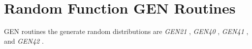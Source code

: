 \begin{comment}
\documentclass[10pt]{article}
\usepackage{fullpage, graphicx, url}
\setlength{\parskip}{1ex}
\setlength{\parindent}{0ex}
\title{Random Function GEN Routines}



\begin{tabular}{ccc}
The Alternative Csound Reference Manual & & \\
Previous &The Standard Numeric Score &Next

\end{tabular}

\end{comment}
\section{Random Function GEN Routines}


  GEN routines the generate random distributions are \emph{GEN21}
, \emph{GEN40}
, \emph{GEN41}
, and \emph{GEN42}
. 


\begin{comment}
\begin{tabular}{lcr}
Previous &Home &Next \\
Window Function GEN Routines &Up &Waveshaping GEN Routines

\end{tabular}



\end{comment}
